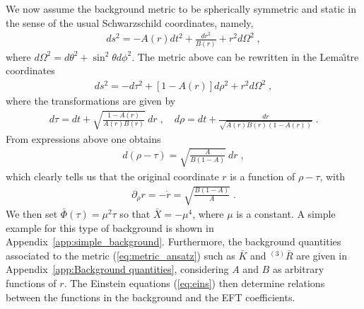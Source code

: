 \documentclass[a4paper,11pt]{article}
\numberwithin{equation}{section}
\begin{document}
We now assume the background metric to be spherically symmetric and static in the sense of the usual Schwarzschild coordinates, namely, 
\begin{align}
ds^2 = -A(r) dt^2 + \frac{dr^2}{B(r)} + r^2 d\Omega^2 \;,
\end{align}
where $d\Omega^2 = d\theta^2 + \sin^2\theta d\phi^2$. The metric above can be rewritten in the Lema\^{\i}tre coordinates  \cite{Lemaitre:1933gd,Takahashi:2021bml}
\begin{align}\label{eq:metric_ansatz}
ds^2 = -d\tau^2 + [1 - A(r)] d\rho^2+ r^2 d\Omega^2 \;,
\end{align}
where the transformations are given by
\begin{align} \label{eq:taurho-tr}
d\tau = dt + \sqrt{\frac{1 - A(r)}{A(r)B(r)}}~dr \;, \quad d\rho = dt + \frac{dr}{\sqrt{A(r)B(r)(1 - A(r))}} \;.
\end{align}
From expressions above one obtains
\begin{align}
d(\rho - \tau) = \sqrt{\frac{A}{B(1 - A)}}~dr \;,
\end{align}
which clearly tells us that the original coordinate $r$ is a function of $\rho - \tau$, with 
\begin{align}
\partial_\rho r = -\dot{r} = \sqrt{\frac{B(1 - A)}{A}} \;.
\end{align}
We then set $\bar{\Phi}(\tau) = \mu^2 \tau$ so that $\bar{X}=-\mu^4$, where $\mu$ is a constant. A simple example for this type of background is shown in Appendix~\ref{app:simple_background}. Furthermore, the background quantities associated to the metric (\ref{eq:metric_ansatz}) such as $\bar{K}$ and ${}^{(3)}\!\bar{R}$ are given in Appendix~\ref{app:Background quantities}, considering $A$ and $B$ as arbitrary functions of $r$. The Einstein equations (\ref{eq:eins}) then determine relations between the functions in the background and the EFT coefficients. 
\end{document}
